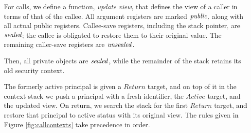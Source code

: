 \documentclass[10pt,conference]{ieeetran}%
\theoremstyle{definition}
\begin{document}
For calls, we define a function, {\it update view}, that defines the view
of a caller in terms of that of the callee. All argument registers are marked
\(\mathit{public}\), along with all actual public registers. Callee-save registers,
including the stack pointer, are \(\mathit{sealed}\); the callee is obligated to restore
them to their original value. The remaining caller-save registers are \(\mathit{unsealed}\).

Then, all private objects are \(\mathit{sealed}\), while the remainder of the stack retains
its old security context.

The formerly active principal is given a \(\mathit{Return}\) target, and on top of
it in the context stack we push a principal with a fresh identifier, the \(\mathit{Active}\)
target, and the updated view. On return, we search the stack for the first
\(\mathit{Return}\) target, and restore that principal to active status with its
original view. The rules given in Figure \ref{fig:callcontexts} take precedence
in order.
\end{document}
